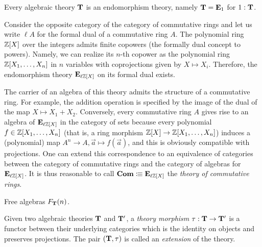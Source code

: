 {\begin{remark}
  Every algebraic theory \(\mathbf{T}\) is an endomorphism theory, namely \(\mathbf{T}=\mathbf{E}_1\) for \(1:\mathbf{T}\).
\end{remark}

\begin{example}
  Consider the opposite category of the category of commutative rings and let us write \(\ell A\) for the formal dual of a commutative ring \(A\).
  The polynomial ring \(\mathbb{Z}[X]\) over the integers admits finite copowers (the formally dual concept to powers).
  Namely, we can realize its \(n\)-th copower as the polynomial ring \(\mathbb{Z}[X_1,\dots,X_n]\) in \(n\) variables with coprojections given by \(X\mapsto X_i\).
  Therefore, the endomorphism theory \(\mathbf{E}_{\ell\mathbb{Z}[X]}\) on its formal dual exists.

  The carrier of an algebra of this theory admits the structure of a commutative ring.
  For example, the addition operation is specified by the image of the dual of the map \(X\mapsto X_1+X_2\).
  Conversely, every commutative ring \(A\) gives rise to an algebra of \(\mathbf{E}_{\ell\mathbb{Z}[X]}\) in the category of sets because every polynomial \(f\in\mathbb{Z}[X_1,\dots,X_n]\) (that is, a ring morphism \(\mathbb{Z}[X]\to\mathbb{Z}[X_1,\dots,X_n]\)) induces a (polynomial) map \(A^n\to A, \vec{a}\mapsto f(\vec{a})\), and this is obviously compatible with projections.
  One can extend this correspondence to an equivalence of categories between the category of commutative rings and the category of algebras for \(\mathbf{E}_{\ell\mathbb{Z}[X]}\).
  It is thus reasonable to call \(\mathbf{Com}\vcentcolon\mspace{-1.2mu}\equiv\mathbf{E}_{\ell\mathbb{Z}[X]}\) the \emph{theory of commutative rings}.
\end{example}

\begin{definition}
  Free algebras \(F_{\mathbf{T}}(n)\).
\end{definition}

Given two algebraic theories \(\mathbf{T}\) and \(\mathbf{T}'\), a \emph{theory morphism} \(\tau:\mathbf{T}\to\mathbf{T}'\) is a functor between their underlying categories which is the identity on objects and preserves projections.
The pair \((\mathbf{T},\tau)\) is called an \emph{extension} of the theory.

}
